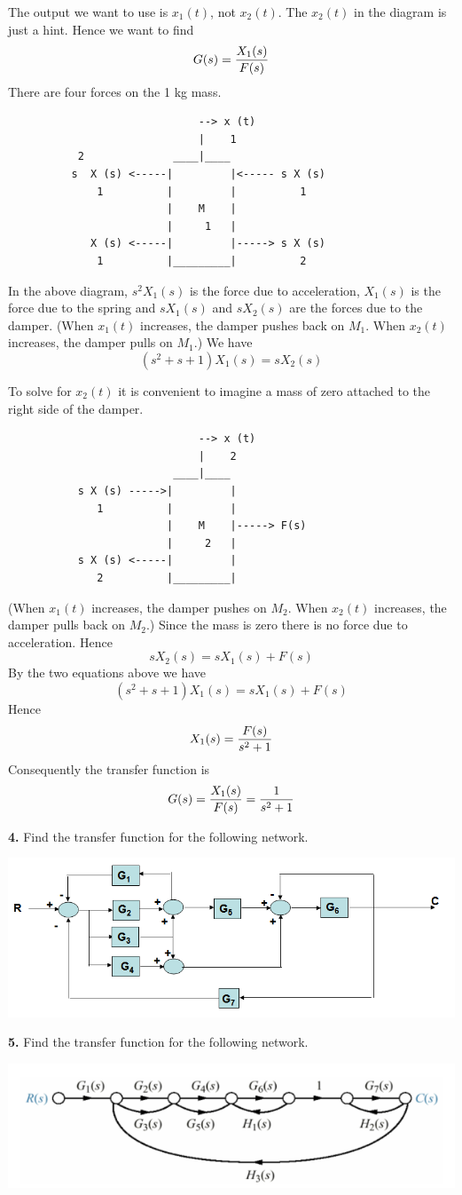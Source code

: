 \documentclass[11pt]{report}
\begin{document}
\bigskip
\noindent
The output we want to use is $x_1(t)$, not $x_2(t)$.
The $x_2(t)$ in the diagram is just a hint.
Hence we want to find
$$G(s)={X_1(s)\over F(s)}$$
There are four forces on the 1 kg mass.
\begin{verbatim}
                              --> x (t)
                              |    1
           2              ____|____
          s  X (s) <-----|         |<----- s X (s)
              1          |         |          1
                         |    M    |
                         |     1   |
             X (s) <-----|         |-----> s X (s)
              1          |_________|          2
\end{verbatim}
In the above diagram, $s^2X_1(s)$ is the force due to acceleration,
$X_1(s)$ is the force due to the spring and
$sX_1(s)$ and $sX_2(s)$ are the forces due to the damper.
(When $x_1(t)$ increases, the damper pushes back on $M_1$.
When $x_2(t)$ increases, the damper pulls on $M_1$.)
We have
$$(s^2+s+1)X_1(s)=sX_2(s)$$

\newpage

\noindent
To solve for $x_2(t)$ it is convenient to imagine a mass of zero attached
to the right side of the damper.
\begin{verbatim}
                              --> x (t)
                              |    2
                          ____|____
           s X (s) ----->|         |
              1          |         |
                         |    M    |-----> F(s)
                         |     2   |
           s X (s) <-----|         |
              2          |_________|
\end{verbatim}
(When $x_1(t)$ increases, the damper pushes on $M_2$.
When $x_2(t)$ increases, the damper pulls back on $M_2$.)
Since the mass is zero there is no force due to acceleration.
Hence
$$sX_2(s)=sX_1(s)+F(s)$$
By the two equations above we have
$$(s^2+s+1)X_1(s)=sX_1(s)+F(s)$$
Hence
$$X_1(s)={F(s)\over s^2+1}$$
Consequently the transfer function is
$$G(s)={X_1(s)\over F(s)}={1\over s^2+1}$$

\newpage

\noindent
{\bf 4.} Find the transfer function for the following network.
\begin{center}
\includegraphics[scale=0.25]{images/210-3.png}
\end{center}

\newpage

\noindent
{\bf 5.} Find the transfer function for the following network.
\begin{center}
\includegraphics[scale=0.5]{images/210-4.png}
\end{center}
\end{document}
